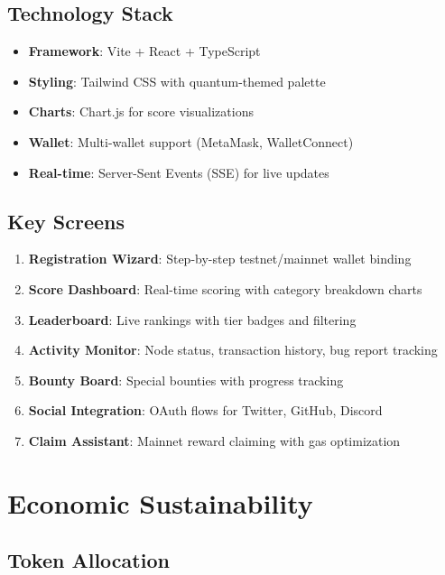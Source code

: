 \documentclass[11pt,a4paper]{article}
\begin{document}
\subsection{Technology Stack}

\begin{itemize}
    \item \textbf{Framework}: Vite + React + TypeScript
    \item \textbf{Styling}: Tailwind CSS with quantum-themed palette
    \item \textbf{Charts}: Chart.js for score visualizations
    \item \textbf{Wallet}: Multi-wallet support (MetaMask, WalletConnect)
    \item \textbf{Real-time}: Server-Sent Events (SSE) for live updates
\end{itemize}

\subsection{Key Screens}

\begin{enumerate}
    \item \textbf{Registration Wizard}: Step-by-step testnet/mainnet wallet binding
    \item \textbf{Score Dashboard}: Real-time scoring with category breakdown charts
    \item \textbf{Leaderboard}: Live rankings with tier badges and filtering
    \item \textbf{Activity Monitor}: Node status, transaction history, bug report tracking
    \item \textbf{Bounty Board}: Special bounties with progress tracking
    \item \textbf{Social Integration}: OAuth flows for Twitter, GitHub, Discord
    \item \textbf{Claim Assistant}: Mainnet reward claiming with gas optimization
\end{enumerate}

\section{Economic Sustainability}

\subsection{Token Allocation}
\end{document}

